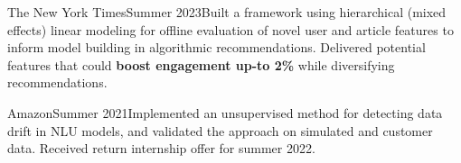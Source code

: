   {The New York Times}{Summer 2023}{}{Built a framework using hierarchical (mixed effects) linear modeling for offline evaluation of novel user and article features to inform model building in algorithmic recommendations. Delivered potential features that could \textbf{boost engagement up-to 2\%} while diversifying recommendations.}


  {Amazon}{Summer 2021}{}{Implemented an unsupervised method for detecting data drift in NLU models, and validated the approach on simulated and customer data. Received return internship offer for summer 2022.}
